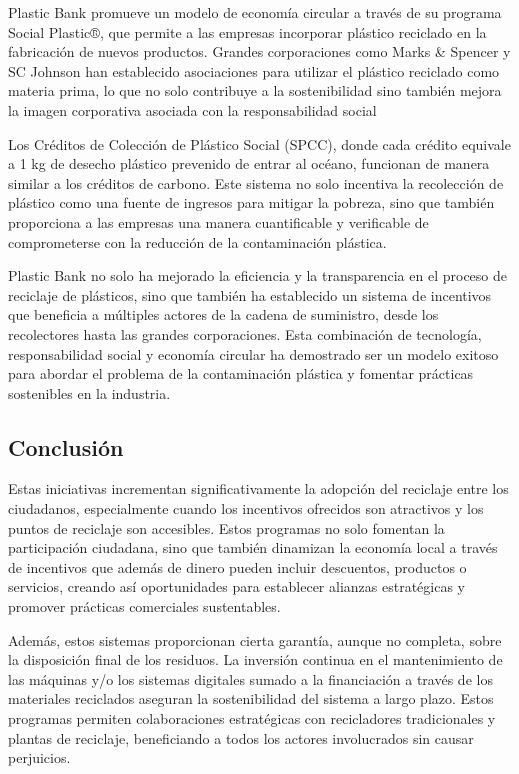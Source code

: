 \documentclass[main.tex]{subfiles}
\begin{document}
Plastic Bank promueve un modelo de economía circular a través de su programa Social Plastic®, que permite a las empresas incorporar plástico reciclado en la fabricación de nuevos productos. Grandes corporaciones como Marks \& Spencer y SC Johnson han establecido asociaciones para utilizar el plástico reciclado como materia prima, lo que no solo contribuye a la sostenibilidad sino también mejora la imagen corporativa asociada con la responsabilidad social \cite{BHUBALAN2022113631}

Los Créditos de Colección de Plástico Social (SPCC), donde cada crédito equivale a 1 kg de desecho plástico prevenido de entrar al océano, funcionan de manera similar a los créditos de carbono. Este sistema no solo incentiva la recolección de plástico como una fuente de ingresos para mitigar la pobreza, sino que también proporciona a las empresas una manera cuantificable y verificable de comprometerse con la reducción de la contaminación plástica.

Plastic Bank no solo ha mejorado la eficiencia y la transparencia en el proceso de reciclaje de plásticos, sino que también ha establecido un sistema de incentivos que beneficia a múltiples actores de la cadena de suministro, desde los recolectores hasta las grandes corporaciones. Esta combinación de tecnología, responsabilidad social y economía circular ha demostrado ser un modelo exitoso para abordar el problema de la contaminación plástica y fomentar prácticas sostenibles en la industria.

\subsection{Conclusión}
Estas iniciativas incrementan significativamente la adopción del reciclaje entre los ciudadanos, especialmente cuando los incentivos ofrecidos son atractivos y los puntos de reciclaje son accesibles. Estos programas no solo fomentan la participación ciudadana, sino que también dinamizan la economía local a través de incentivos que además de dinero pueden incluir descuentos, productos o servicios, creando así oportunidades para establecer alianzas estratégicas y promover prácticas comerciales sustentables.

Además, estos sistemas proporcionan cierta garantía, aunque no completa, sobre la disposición final de los residuos. La inversión continua en el mantenimiento de las máquinas y/o los sistemas digitales sumado a la financiación a través de los materiales reciclados aseguran la sostenibilidad del sistema a largo plazo. Estos programas permiten colaboraciones estratégicas con recicladores tradicionales y plantas de reciclaje, beneficiando a todos los actores involucrados sin causar perjuicios.
\end{document}
